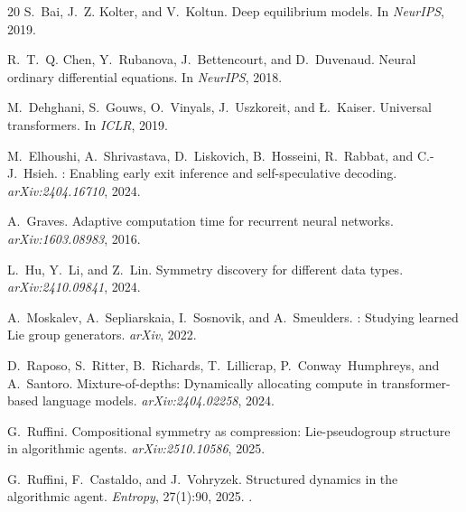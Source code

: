 \documentclass[11pt,a4paper]{article}
\begin{document}
\begin{thebibliography}{20}
S.~Bai, J.~Z. Kolter, and V.~Koltun.
\newblock Deep equilibrium models.
\newblock In \emph{NeurIPS}, 2019.

R.~T.~Q. Chen, Y.~Rubanova, J.~Bettencourt, and D.~Duvenaud.
\newblock Neural ordinary differential equations.
\newblock In \emph{NeurIPS}, 2018.

M.~Dehghani, S.~Gouws, O.~Vinyals, J.~Uszkoreit, and \L.~Kaiser.
\newblock Universal transformers.
\newblock In \emph{ICLR}, 2019.

M.~Elhoushi, A.~Shrivastava, D.~Liskovich, B.~Hosseini,
  R.~Rabbat, and C.-J.~Hsieh.
: Enabling early exit inference and
  self-speculative decoding.
\newblock \emph{arXiv:2404.16710}, 2024.

A.~Graves.
\newblock Adaptive computation time for recurrent neural networks.
\newblock \emph{arXiv:1603.08983}, 2016.

L.~Hu, Y.~Li, and Z.~Lin.
\newblock Symmetry discovery for different data types.
\newblock \emph{arXiv:2410.09841}, 2024.

A.~Moskalev, A.~Sepliarskaia, I.~Sosnovik, and A.~Smeulders.
: Studying learned {L}ie group generators.
\newblock \emph{arXiv}, 2022.

D.~Raposo, S.~Ritter, B.~Richards, T.~Lillicrap,
  P.~Conway~Humphreys, and A.~Santoro.
\newblock Mixture-of-depths: Dynamically allocating compute
  in transformer-based language models.
\newblock \emph{arXiv:2404.02258}, 2024.

G.~Ruffini.
\newblock Compositional symmetry as compression:
  {L}ie-pseudogroup structure in algorithmic agents.
\newblock \emph{arXiv:2510.10586}, 2025.

G.~Ruffini, F.~Castaldo, and J.~Vohryzek.
\newblock Structured dynamics in the algorithmic agent.
\newblock \emph{Entropy}, 27(1):90, 2025.
\newblock {}.

\end{thebibliography}
\end{document}
